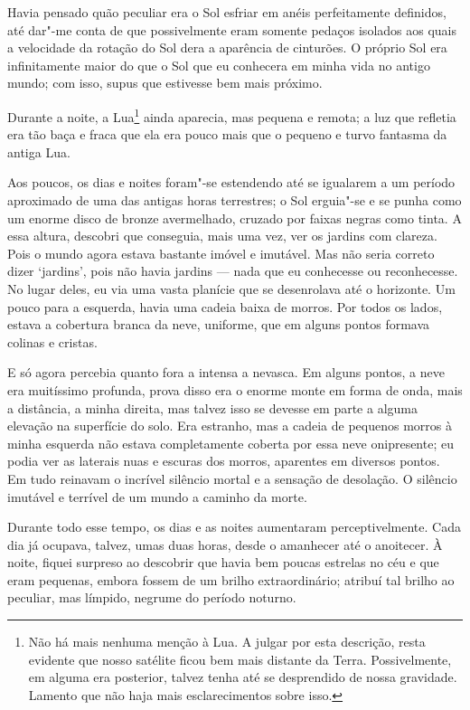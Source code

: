 Havia pensado quão peculiar era o Sol esfriar em anéis perfeitamente definidos, até dar"-me conta de que possivelmente
eram somente pedaços isolados aos quais a velocidade da rotação do Sol dera a aparência de cinturões. O próprio Sol era
infinitamente maior do que o Sol que eu conhecera em minha vida no antigo mundo; com isso, supus que estivesse bem
mais próximo.

Durante a noite, a Lua\footnote{ Não há mais nenhuma menção à Lua. A julgar
por esta descrição, resta evidente que nosso satélite ficou bem mais
distante da Terra. Possivelmente, em alguma era posterior, talvez tenha até se
desprendido de nossa gravidade. Lamento que não haja mais esclarecimentos sobre
isso.} ainda aparecia, mas pequena e remota; a luz que refletia era
tão baça e fraca que ela era pouco mais que o pequeno e turvo fantasma da antiga Lua.

Aos poucos, os dias e noites foram"-se estendendo até se igualarem a um período aproximado de uma das antigas horas
terrestres; o Sol erguia"-se e se punha como um enorme disco de bronze avermelhado, cruzado por faixas negras como
tinta. A essa altura, descobri que conseguia, mais uma vez, ver os jardins com clareza. Pois o mundo agora estava
bastante imóvel e imutável. Mas não seria correto dizer ‘jardins’, pois não havia jardins --- nada que eu conhecesse ou
reconhecesse. No lugar deles, eu via uma vasta planície que se desenrolava até o horizonte. Um pouco para a esquerda,
havia uma cadeia baixa de morros. Por todos os lados, estava a cobertura branca da neve, uniforme, que em alguns pontos
formava colinas e cristas.

E só agora percebia quanto fora a intensa a nevasca. Em alguns pontos, a neve era muitíssimo profunda, prova
disso era o enorme monte em forma de onda, mais a distância, a minha direita, mas talvez isso se devesse em parte a alguma
elevação na superfície do solo. Era estranho, mas a cadeia de pequenos morros à minha esquerda não estava completamente
coberta por essa neve onipresente; eu podia ver as laterais nuas e escuras dos morros, aparentes em diversos pontos. Em
tudo reinavam o incrível silêncio mortal e a sensação de desolação. O silêncio imutável e terrível de um mundo a
caminho da morte.

Durante todo esse tempo, os dias e as noites aumentaram perceptivelmente. Cada dia já ocupava, talvez, umas duas horas,
desde o amanhecer até o anoitecer. À noite, fiquei surpreso ao descobrir que havia bem poucas estrelas no céu e que
eram pequenas, embora fossem de um brilho extraordinário; atribuí tal brilho ao peculiar, mas límpido, negrume do
período noturno.

